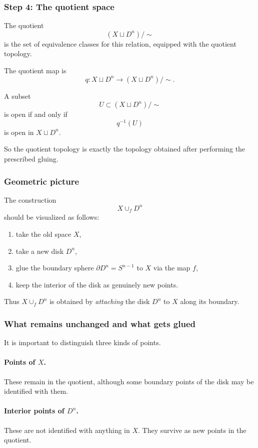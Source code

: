 \documentclass[12pt,a4paper]{article}
\theoremstyle{notespace}
\begin{document}
\subsubsection{Step 4: The quotient space}

The quotient
\[
(X\sqcup D^n)/\sim
\]
is the set of equivalence classes for this relation, equipped with the quotient topology.

The quotient map is
\[
q:X\sqcup D^n\to (X\sqcup D^n)/\sim.
\]

A subset
\[
U\subset (X\sqcup D^n)/\sim
\]
is open if and only if
\[
q^{-1}(U)
\]
is open in \(X\sqcup D^n\).

So the quotient topology is exactly the topology obtained after performing the prescribed gluing.

\subsubsection{Geometric picture}

The construction
\[
X\cup_f D^n
\]
should be visualized as follows:

\begin{enumerate}
	\item take the old space \(X\),
	\item take a new disk \(D^n\),
	\item glue the boundary sphere \(\partial D^n=S^{n-1}\) to \(X\) via the map \(f\),
	\item keep the interior of the disk as genuinely new points.
\end{enumerate}

Thus \(X\cup_f D^n\) is obtained by \emph{attaching} the disk \(D^n\) to \(X\) along its boundary.

\subsubsection{What remains unchanged and what gets glued}

It is important to distinguish three kinds of points.

\paragraph{Points of \(X\).}
These remain in the quotient, although some boundary points of the disk may be identified with them.

\paragraph{Interior points of \(D^n\).}
These are not identified with anything in \(X\). They survive as new points in the quotient.
\end{document}

